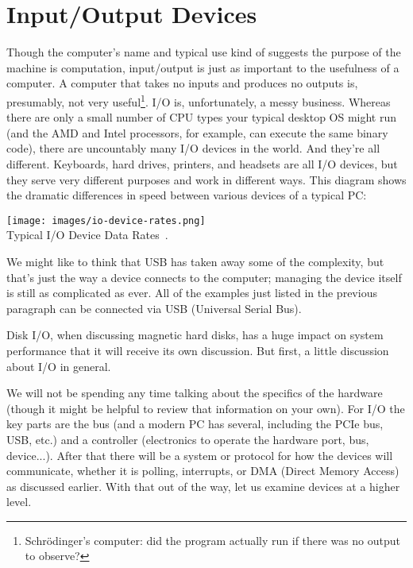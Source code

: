 




\section*{Input/Output Devices}
Though the computer's name and typical use kind of suggests the purpose of the machine is computation, input/output is just as important to the usefulness of a computer. A computer that takes no inputs and produces no outputs is, presumably, not very useful\footnote{Schr\"odinger's computer: did the program actually run if there was no output to observe?}. I/O is, unfortunately, a messy business. Whereas there are only a small number of CPU types your typical desktop OS might run (and the AMD and Intel processors, for example, can execute the same binary code), there are uncountably many I/O devices in the world. And they're all different. Keyboards, hard drives, printers, and headsets are all I/O devices, but they serve very different purposes and work in different ways. This diagram shows the dramatic differences in speed between various devices of a typical PC:

\begin{center}
	\texttt{[image: images/io-device-rates.png]}\\
	Typical I/O Device Data Rates~\cite{osi}.
\end{center}

We might like to think that USB has taken away some of the complexity, but that's just the way a device connects to the computer; managing the device itself is still as complicated as ever. All of the examples just listed in the previous paragraph can be connected via USB (Universal Serial Bus). 

Disk I/O, when discussing magnetic hard disks, has a huge impact on system performance that it will receive its own discussion. But first, a little discussion about I/O in general.

We will not be spending any time talking about the specifics of the hardware (though it might be helpful to review that information on your own). For I/O the key parts are the bus (and a modern PC has several, including the PCIe bus, USB, etc.) and a controller (electronics to operate the hardware port, bus, device...). After that there will be a system or protocol for how the devices will communicate, whether it is polling, interrupts, or DMA (Direct Memory Access) as discussed earlier. With that out of the way, let us examine devices at a higher level.

